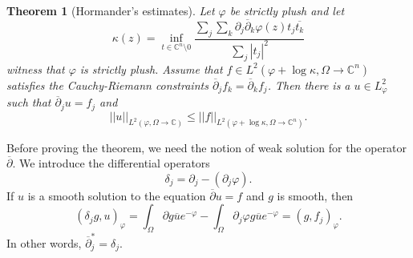 \documentclass[12pt]{report}
\newcommand{\CC}{\mathbb{C}}
\newcommand{\dbar}{\overline \partial}
\newtheorem{theorem}{Theorem}[chapter]
\theoremstyle{definition}
\begin{document}
\begin{theorem}[Hormander's estimates]
    Let $\varphi$ be strictly plush and let
    $$\kappa(z) = \inf_{t \in \CC^n \setminus 0} \frac{\sum_j\sum_k \partial_j \dbar_k \varphi(z) t_j \overline{t_k}}{\sum_j |t_j|^2}$$
    witness that $\varphi$ is strictly plush. Assume that $f \in L^2(\varphi + \log \kappa, \Omega \to \CC^n)$ satisfies the Cauchy-Riemann constraints $\dbar_j f_k = \dbar_k f_j$. Then there is a $u \in L^2_\varphi$ such that $\dbar_j u = f_j$ and
    $$||u||_{L^2(\varphi, \Omega \to \CC)} \leq ||f||_{L^2(\varphi + \log \kappa, \Omega \to \CC^n)}.$$
\end{theorem}
Before proving the theorem, we need the notion of weak solution for the operator $\dbar$. We introduce the differential operators
$$\delta_j = \partial_j - (\partial_j \varphi).$$
If $u$ is a smooth solution to the equation $\dbar u = f$ and $g$ is smooth, then
$$(\delta_j g, u)_\varphi
    = \int_\Omega \partial g \overline u e^{-\varphi} - \int_\Omega \partial_j \varphi g \overline u e^{-\varphi}
    = (g, f_j)_\varphi.$$
In other words, $\dbar_j^* = \delta_j$. 
\end{document}
